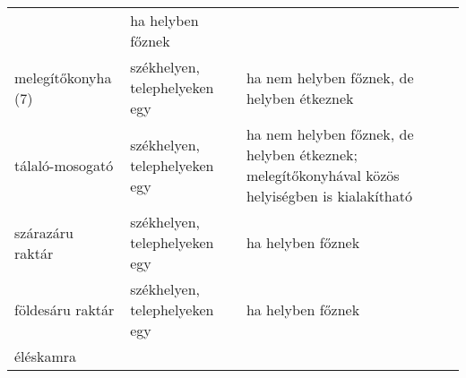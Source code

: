 \documentclass{article}
\begin{document}
\begin{longtable}[]{@{}lll@{}}
\begin{minipage}[t]{0.26\columnwidth}
\end{minipage} & \begin{minipage}[t]{0.51\columnwidth}\raggedright
ha helyben főznek\strut
\end{minipage}\tabularnewline
\begin{minipage}[t]{0.13\columnwidth}\raggedright
melegítőkonyha (7)\strut
\end{minipage} & \begin{minipage}[t]{0.26\columnwidth}\raggedright
székhelyen, telephelyeken egy\strut
\end{minipage} & \begin{minipage}[t]{0.51\columnwidth}\raggedright
ha nem helyben főznek, de helyben étkeznek\strut
\end{minipage}\tabularnewline
\begin{minipage}[t]{0.13\columnwidth}\raggedright
tálaló-mosogató\strut
\end{minipage} & \begin{minipage}[t]{0.26\columnwidth}\raggedright
székhelyen, telephelyeken egy\strut
\end{minipage} & \begin{minipage}[t]{0.51\columnwidth}\raggedright
ha nem helyben főznek, de helyben étkeznek; melegítőkonyhával közös
helyiségben is kialakítható\strut
\end{minipage}\tabularnewline
\begin{minipage}[t]{0.13\columnwidth}\raggedright
szárazáru raktár\strut
\end{minipage} & \begin{minipage}[t]{0.26\columnwidth}\raggedright
székhelyen, telephelyeken egy\strut
\end{minipage} & \begin{minipage}[t]{0.51\columnwidth}\raggedright
ha helyben főznek\strut
\end{minipage}\tabularnewline
\begin{minipage}[t]{0.13\columnwidth}\raggedright
földesáru raktár\strut
\end{minipage} & \begin{minipage}[t]{0.26\columnwidth}\raggedright
székhelyen, telephelyeken egy\strut
\end{minipage} & \begin{minipage}[t]{0.51\columnwidth}\raggedright
ha helyben főznek\strut
\end{minipage}\tabularnewline
\begin{minipage}[t]{0.13\columnwidth}\raggedright
éléskamra\strut
\end{minipage} & \begin{minipage}[t]{0.26\columnwidth}\raggedright

\end{minipage}
\end{longtable}
\end{document}
